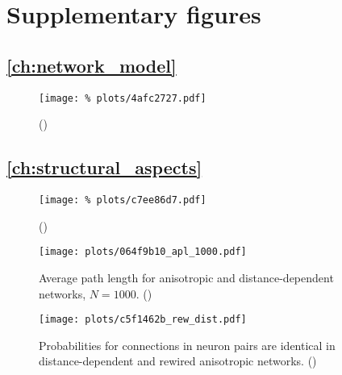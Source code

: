 





\section{Supplementary figures}\label{sec:supp_figures}

\subsection*{\autoref{ch:network_model}}

\begin{figure}[H]
  \centering
  \texttt{[image: \%
    plots/4afc2727.pdf]}
  \caption{()}
  \label{suppfig:rew_stats}
\end{figure}


\subsection*{\autoref{ch:structural_aspects}}

\begin{figure}[H]
  \centering
  \texttt{[image: \%
    plots/c7ee86d7.pdf]}
  \caption{()}
  \label{suppfig:out_degree}
\end{figure}


\begin{figure}[htp]
  \centering
  \texttt{[image: plots/064f9b10\_apl\_1000.pdf]}
  \caption{Average path length for anisotropic and distance-dependent
    networks, $N=1000$. ()} %
  \label{suppfig:small_world}
\end{figure}


\begin{figure}[htp]
  \centering
  \texttt{[image: plots/c5f1462b\_rew\_dist.pdf]}
  \caption{Probabilities for connections in neuron pairs are identical
    in distance-dependent and rewired anisotropic
    networks. ()} %
  \label{suppfig:two_neurons_dist_rew}
  \end{figure}

